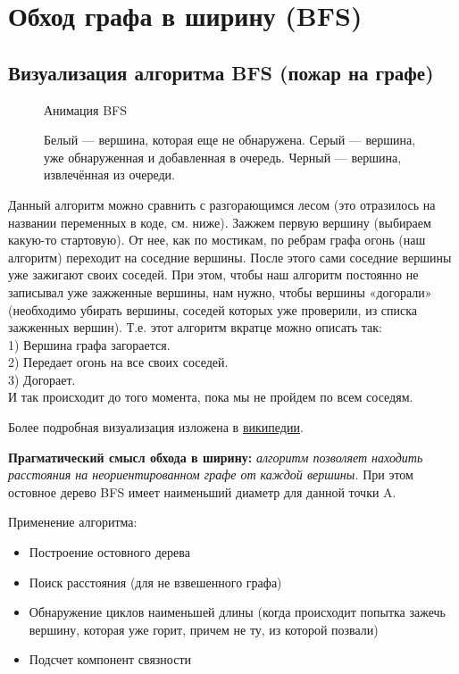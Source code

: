 \chapter{Обход графа в ширину (BFS)}
\section{Визуализация алгоритма BFS (пожар на графе)}
\begin{wrapfigure}{r}{0.4\linewidth}
\begin{frame}{Анимация BFS}
\end{frame}
\caption{Белый — вершина, которая еще не обнаружена. Серый — вершина, уже обнаруженная и добавленная в очередь. Черный — вершина, извлечённая из очереди.}
\vspace{-0.7cm}
\end{wrapfigure}

Данный алгоритм можно сравнить с разгорающимся лесом (это отразилось на названии переменных в коде, см. ниже). Зажжем первую вершину (выбираем какую-то стартовую). От нее, как по мостикам, по ребрам графа огонь (наш алгоритм) переходит на соседние вершины. После этого сами соседние вершины уже зажигают своих соседей. При этом, чтобы наш алгоритм постоянно не записывал уже зажженные вершины, нам нужно, чтобы вершины «догорали» (необходимо убирать вершины, соседей которых уже проверили, из списка зажженных вершин). Т.е. этот алгоритм вкратце можно описать так:\\
1) Вершина графа загорается.\\
2) Передает огонь на все своих соседей.\\
3) Догорает.\\
И так происходит до того момента, пока мы не пройдем по всем соседям.


Более подробная визуализация изложена в \href{https://ru.wikipedia.org/wiki/%D0%9F%D0%BE%D0%B8%D1%81%D0%BA_%D0%B2_%D1%88%D0%B8%D1%80%D0%B8%D0%BD%D1%83}{википедии}.

\textbf{Прагматический смысл обхода в ширину:} \textit{алгоритм позволяет находить расстояния на неориентированном графе от каждой вершины.}  При этом остовное дерево BFS имеет наименьший диаметр для данной точки A.



Применение алгоритма:
\begin{itemize}
	\item Построение остовного дерева
	\item Поиск расстояния (для не взвешенного графа)
	\item Обнаружение циклов наименьшей длины (когда происходит попытка зажечь вершину, которая уже горит, причем не ту, из которой позвали) 
	\item Подсчет компонент связности
\end{itemize}

